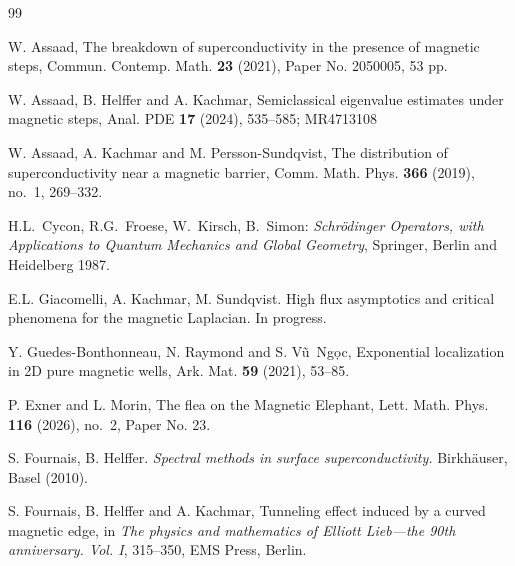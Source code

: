\documentclass[11pt]{amsart}
\theoremstyle{remark}
\numberwithin{equation}{section}
\begin{document}
\begin{thebibliography}{99}

 W. Assaad, The breakdown of superconductivity in the presence of magnetic steps, Commun. Contemp. Math. {\bf 23} (2021),  Paper No. 2050005, 53 pp.

 W. Assaad, B. Helffer and A. Kachmar, Semiclassical eigenvalue estimates under magnetic steps, Anal. PDE {\bf 17} (2024),  535--585; MR4713108

 W. Assaad, A. Kachmar and M. Persson-Sundqvist, The distribution of superconductivity near a magnetic barrier, Comm. Math. Phys. {\bf 366} (2019), no.~1, 269--332.

 H.L.~Cycon, R.G.~Froese, W.~Kirsch, B.~Simon: \emph{ Schr\"odinger Operators, with Applications to Quantum Mechanics and Global
Geometry}, Springer, Berlin and Heidelberg 1987.


 E.L. Giacomelli, A. Kachmar, M. Sundqvist. High flux asymptotics and critical phenomena for the magnetic Laplacian. In progress.

 Y. Guedes-Bonthonneau, N. Raymond and S. V\~u~Ng\d oc, Exponential localization in 2D pure magnetic wells, Ark. Mat. {\bf 59} (2021),  53--85.




 P. Exner and L. Morin, The flea on the Magnetic Elephant, Lett. Math. Phys. {\bf 116} (2026), no.~2, Paper No. 23.


 S. Fournais, B. Helffer. \textit{Spectral methods in surface superconductivity.} Birkh\"auser, Basel (2010). 

 S. Fournais, B. Helffer and A. Kachmar, Tunneling effect induced by a curved magnetic edge, in {\it The physics and mathematics of Elliott Lieb---the 90th anniversary. Vol. I}, 315--350, EMS Press, Berlin.


\end{thebibliography}
\end{document}
